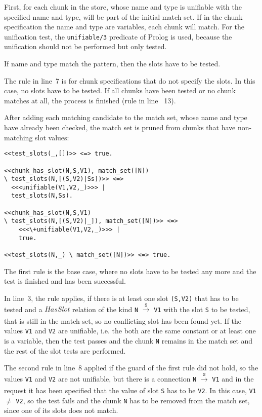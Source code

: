 First, for each chunk in the store, whose name and type is unifiable with the specified name and type, will be part of the initial match set. If in the chunk specification the name and type are variables, each chunk will match. For the unification test, the \verb|unifiable/3| predicate of Prolog is used, because the unification should not be performed but only tested. 

If name and type match the pattern, then the slots have to be tested.

The rule in line~7 is for chunk specifications that do not specify the slots. In this case, no slots have to be tested. If all chunks have been tested or no chunk matches at all, the process is finished (rule in line ~13).

After adding each matching candidate to the match set, whose name and type have already been checked, the match set is pruned from chunks that have non-matching slot values:

\begin{lstlisting}
<<test_slots(_,[])>> <=> true.

<<chunk_has_slot(N,S,V1), match_set([N]) 
\ test_slots(N,[(S,V2)|Ss])>> <=> 
  <<<unifiable(V1,V2,_)>>> | 
  test_slots(N,Ss).

<<chunk_has_slot(N,S,V1) 
\ test_slots(N,[(S,V2)|_]), match_set([N])>> <=> 
    <<<\+unifiable(V1,V2,_)>>> | 
    true.

<<test_slots(N,_) \ match_set([N])>> <=> true.
\end{lstlisting}

The first rule is the base case, where no slots have to be tested any more and the test is finished and has been successful.

In line~3, the rule applies, if there is at least one slot \verb|(S,V2)| that has to be tested and a $HasSlot$ relation of the kind \verb|N| $\xrightarrow[]{\mathtt{S}}$ \verb|V1| with the slot \verb|S| to be tested, that is still in the match set, so no conflicting slot has been found yet. If the values \verb|V1| and \verb|V2| are unifiable, i.e. the both are the same constant or at least one is a variable, then the test passes and the chunk \verb|N| remains in the match set and the rest of the slot tests are performed.

The second rule in line~8 applied if the guard of the first rule did not hold, so the values \verb|V1| and \verb|V2| are not unifiable, but there is a connection \verb|N| $\xrightarrow[]{\mathtt{S}}$ \verb|V1| and in the request it has been specified that the value of slot \verb|S| has to be \verb|V2|. In this case, \verb|V1| $\neq$ \verb|V2|, so the test fails and the chunk \verb|N| has to be removed from the match set, since one of its slots does not match.

